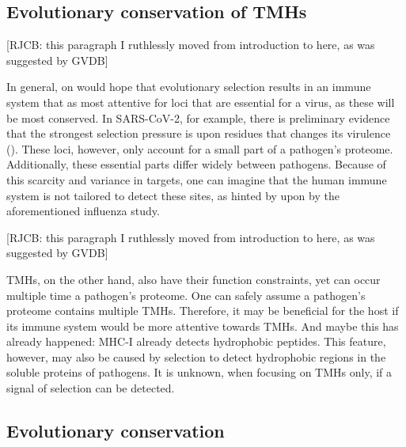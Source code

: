 \subsection{Evolutionary conservation of TMHs}


[RJCB: this paragraph I ruthlessly moved
from introduction to here, as was suggested by GVDB]
 
In general, on would hope that evolutionary selection results in
an immune system that as most attentive for loci that are
essential for a virus, as these will be most conserved.
In SARS-CoV-2, for example, there is preliminary evidence that the strongest
selection pressure is upon residues that changes its 
virulence (\cite{velazquez2020positive}).
These loci, however, only account for a small part of a pathogen's proteome.
Additionally, these essential parts differ widely between pathogens.
Because of this scarcity and variance in targets, 
one can imagine that the human immune system 
is not tailored to detect these sites, 
 as hinted by upon by the aforementioned influenza study.
 

[RJCB: this paragraph I ruthlessly moved
from introduction to here, as was suggested by GVDB]
 
TMHs, on the other hand, also have their function constraints, 
yet can occur multiple time a pathogen's proteome.
One can safely assume a pathogen's proteome contains multiple TMHs.
Therefore, it may be beneficial for the host
if its immune system would be more attentive towards TMHs.
And maybe this has already happened: MHC-I already detects hydrophobic
peptides. This feature, however, may also be caused by selection
to detect hydrophobic regions in the soluble proteins of pathogens.
It is unknown, when focusing on TMHs only, if a signal of selection
can be detected.






\subsection{Evolutionary conservation}

